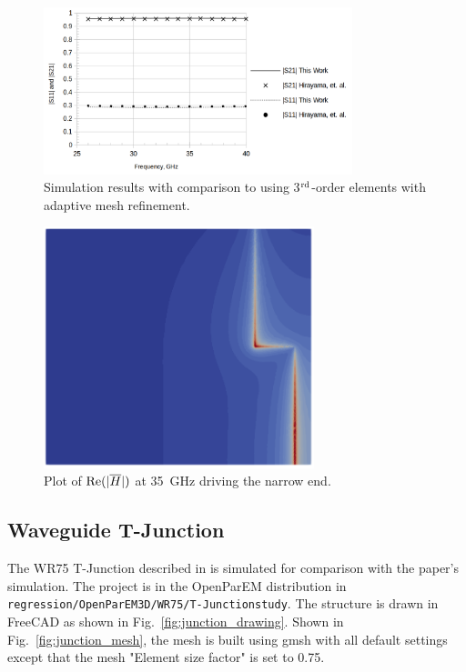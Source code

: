 \documentclass[titlepage]{article}
\renewcommand\_{\textunderscore\linebreak[1]}
\begin{document}
\begin{figure}[H]
  \centering
  \includegraphics[width=0.8\textwidth]{../regression/OpenParEM3D/slotline/step_study/screenshots/step_results}
  \caption{Simulation results with comparison to \cite{Hirayama} using 3$^{\textnormal{rd}}$-order elements with adaptive mesh refinement.}
  \label{fig:step_results}
\end{figure}

\begin{figure}[H]
  \centering
  \includegraphics[width=0.7\textwidth]{../regression/OpenParEM3D/slotline/step_study/screenshots/step_real_H}
  \caption{Plot of $\textnormal{Re}(|\overline{H}|)$ at 35~GHz driving the narrow end.}
  \label{fig:step_plot}
\end{figure}

\subsection{Waveguide T-Junction}

The WR75 T-Junction described in \cite{Alessandri} is simulated for comparison with the paper's simulation.  The project is in the OpenParEM distribution in \texttt{regression/OpenParEM3D/WR75/T-Junction\_study}.  The structure is drawn in FreeCAD as shown in Fig.~\ref{fig:junction_drawing}.  Shown in Fig.~\ref{fig:junction_mesh}, the mesh is built using gmsh with all default settings except that the mesh "Element size factor" is set to 0.75.
\end{document}

